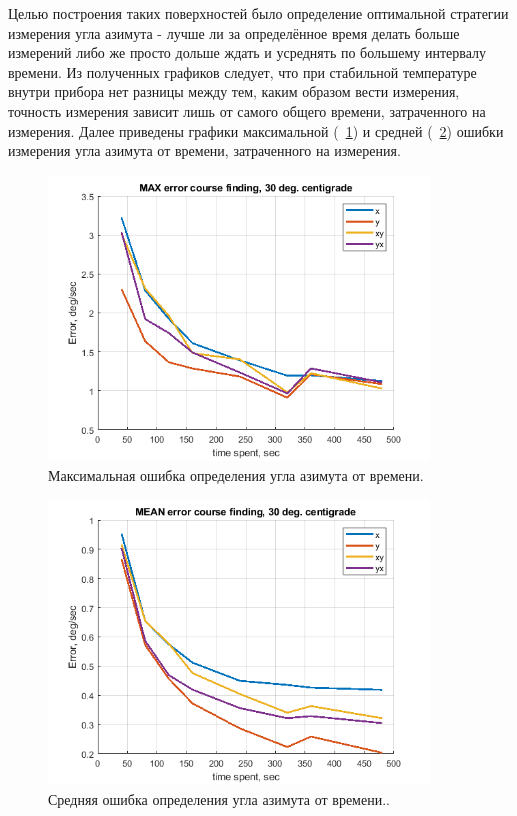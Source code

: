 \documentclass[a4paper,12pt]{article}
\begin{document}
Целью построения таких поверхностей было определение оптимальной стратегии измерения угла азимута - лучше ли за определённое время делать больше измерений либо же просто дольше ждать и усреднять по большему интервалу времени. Из полученных графиков следует, что при стабильной температуре внутри прибора нет разницы между тем, каким образом вести измерения, точность измерения зависит лишь от самого общего времени, затраченного на измерения. Далее приведены графики максимальной (~\ref{fig:err_max}) и средней (~\ref{fig:err_mean}) ошибки измерения угла азимута от времени, затраченного на измерения.

\begin{figure}[h] 
\centering
\includegraphics[width=0.9\textwidth]{err_max.png} 
\caption{\label{fig:err_max} Максимальная ошибка определения угла азимута от времени.}
\end{figure}

\begin{figure}[h] 
\centering
\includegraphics[width=0.9\textwidth]{mean_err.png} 
\caption{\label{fig:err_mean} Средняя ошибка определения угла азимута от времени..}
\end{figure}
\end{document}
